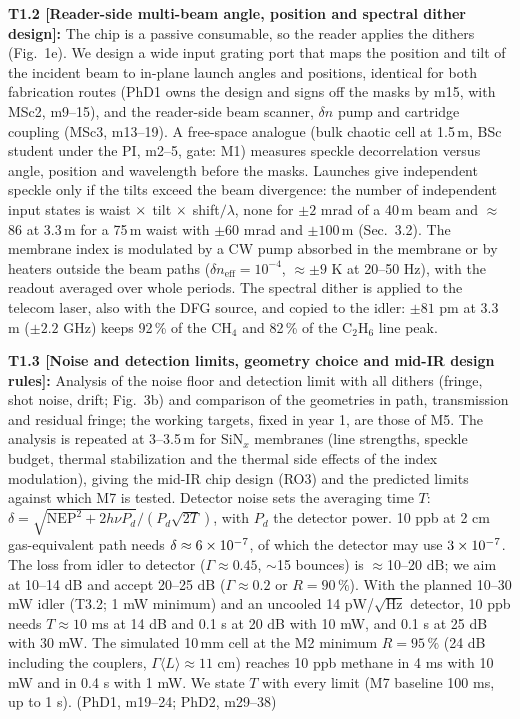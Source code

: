 \documentclass[a4paper,12pt]{article}
\newcommand{\wc}[1]{\textcolor{dkmaroon}{#1}} %
\newcommand{\jc}[1]{\textcolor{dkrust}{#1}} %
\renewcommand{\times}{\mathbin{\text{\texttimes}}}%
\begin{document}
\textbf{T1.2 [Reader-side multi-beam angle, position and spectral dither design]:} \jc{The chip is a passive consumable, so the reader applies the dithers (Fig.~1e). We design a wide input grating port that maps the position and tilt of the incident beam to in-plane launch angles and positions, identical for both fabrication routes (PhD1 owns the design and signs off the masks by m15, with MSc2, m9--15), and the reader-side beam scanner, $\delta n$ pump and cartridge coupling (MSc3, m13--19). A free-space analogue (bulk chaotic cell at 1.5\,\textmu{}m, BSc student under the PI, m2--5, gate: M1) measures speckle decorrelation versus angle, position and wavelength before the masks. Launches give independent speckle only if the tilts exceed the beam divergence: the number of independent input states is waist $\times$ tilt $\times$ shift$/\lambda$, none for $\pm2$ mrad of a 40\,\textmu{}m beam and $\approx$86 at 3.3\,\textmu{}m for a 75\,\textmu{}m waist with $\pm60$ mrad and $\pm100$\,\textmu{}m (Sec.~3.2). The membrane index is modulated by a CW pump absorbed in the membrane or by heaters outside the beam paths ($\delta n_\mathrm{eff}=10^{-4}$, $\approx\pm9$ K at 20--50 Hz), with the readout averaged over whole periods. The spectral dither is applied to the telecom laser, also with the DFG source, and copied to the idler: $\pm81$ pm at 3.3\,\textmu{}m ($\pm2.2$ GHz) keeps 92\,\% of the CH$_4$ and 82\,\% of the C$_2$H$_6$ line peak.}

\textbf{T1.3 [Noise and detection limits, geometry choice and mid-IR design rules]:} \jc{Analysis of the noise floor and detection limit with all dithers (fringe, shot noise, drift; Fig.~3b) and comparison of the geometries in path, transmission and residual fringe; the working targets, fixed in year 1, are those of M5. The analysis is repeated at 3--3.5\,\textmu{}m for SiN$_x$ membranes (line strengths, speckle budget, thermal stabilization and the thermal side effects of the index modulation), giving the mid-IR chip design (RO3) and the predicted limits against which M7 is tested. Detector noise sets the averaging time $T$: $\delta=\sqrt{\mathrm{NEP}^2+2h\nu P_d}/(P_d\sqrt{2T})$, with $P_d$ the detector power. 10 ppb at 2 cm gas-equivalent path needs $\delta\approx6\times10^{-7}$, of which the detector may use $3\times10^{-7}$. The loss from idler to detector ($\Gamma\approx0.45$, ${\sim}$15 bounces) is ${\approx}$10--20 dB; we aim at 10--14 dB and accept 20--25 dB ($\Gamma\approx0.2$ or $R=90\,\%$). With the planned 10--30 mW idler (T3.2; 1 mW minimum) and an uncooled 14 pW/$\sqrt{\mathrm{Hz}}$ detector, 10 ppb needs $T\approx10$ ms at 14 dB and 0.1 s at 20 dB with 10 mW, and 0.1 s at 25 dB with 30 mW. \wc{The simulated 10\,mm cell at the M2 minimum $R=95\,\%$ (24 dB including the couplers, $\Gamma\langle L\rangle\approx11$ cm) reaches 10 ppb methane in 4 ms with 10 mW and in 0.4 s with 1 mW.} We state $T$ with every limit (M7 baseline 100 ms, up to 1 s).} (PhD1, m19--24; PhD2, m29--38)
\end{document}
